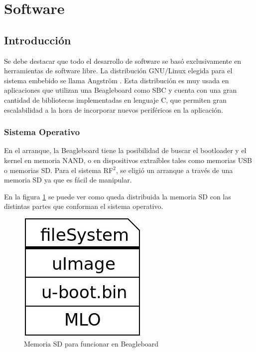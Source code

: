\documentclass[%
        final,
        notitlepage,
        narroweqnarray,
        inline,
        ]{ieee}
\begin{document}
\section{Software}

\subsection{Introducción}
Se debe destacar que todo el desarrollo de software se basó exclusivamente en herramientas de software libre. La distribución GNU/Linux elegida para el sistema embebido se llama Angström \cite{Angs}. Esta distribución es muy usada en aplicaciones que utilizan una Beagleboard como SBC y cuenta con una gran cantidad de bibliotecas implementadas en lenguaje C, que permiten gran escalabilidad a la hora de incorporar nuevos periféricos en la aplicación.


\subsubsection{Sistema Operativo}
En el arranque, la Beagleboard tiene la posibilidad de buscar el bootloader y el kernel en memoria NAND, o en dispositivos extraíbles tales como memorias USB o memorias SD. Para el sistema RF$^{2}$, se eligió un arranque a través de una memoria SD ya que es fácil de manipular.

En la figura \ref{Fig:SD} se puede ver como queda distribuida la memoria SD con las distintas partes
que conforman el sistema operativo. 

\begin{figure}[h]
\centering
  \begin{center}
  \includegraphics[scale=.4]{../docs/Imagenes/sd.jpg} 
  \end{center}
  \caption{Memoria SD para funcionar en Beagleboard}\label{Fig:SD} 
\end{figure}
\end{document}
